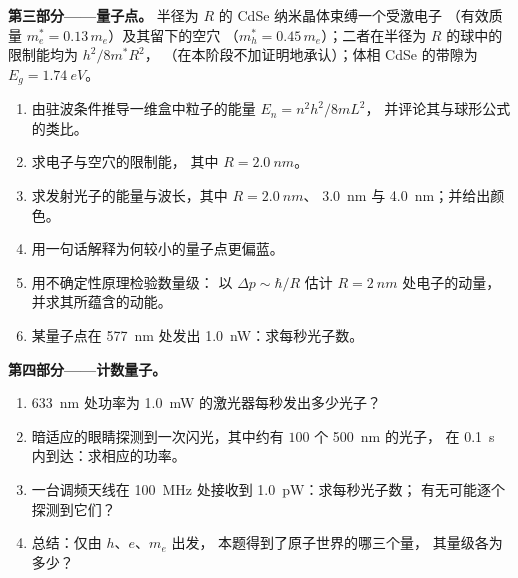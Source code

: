 \begin{problem}
\medskip
\noindent\textbf{第三部分——量子点。}
半径为 $R$ 的 CdSe 纳米晶体束缚一个受激电子
（有效质量 $m_e^\ast = 0.13\,m_e$）及其留下的空穴
（$m_h^\ast = 0.45\,m_e$）；二者在半径为 $R$ 的球中的限制能均为 $h^2/8m^\ast R^2$，
（在本阶段不加证明地承认）；体相 CdSe 的带隙为
$E_g = \qty{1.74}{eV}$。
\begin{enumerate}[resume]
  \item 由驻波条件推导一维盒中粒子的能量
        $E_n = n^2h^2/8mL^2$，
        并评论其与球形公式的类比。
  \item 求电子与空穴的限制能，
        其中 $R = \qty{2.0}{nm}$。
  \item 求发射光子的能量与波长，其中 $R = \qty{2.0}{nm}$、
        \qty{3.0}{nm} 与 \qty{4.0}{nm}；并给出颜色。
  \item 用一句话解释为何较小的量子点更偏蓝。
  \item 用不确定性原理检验数量级：
        以 $\Delta p \sim \hbar/R$ 估计 $R = \qty{2}{nm}$ 处电子的动量，
        并求其所蕴含的动能。
  \item 某量子点在 \qty{577}{nm} 处发出 \qty{1.0}{nW}：求每秒光子数。
\end{enumerate}

\medskip
\noindent\textbf{第四部分——计数量子。}
\begin{enumerate}[resume]
  \item \qty{633}{nm} 处功率为 \qty{1.0}{mW} 的激光器每秒发出多少光子？
  \item 暗适应的眼睛探测到一次闪光，其中约有 $100$ 个 \qty{500}{nm} 的光子，
        在 \qty{0.1}{s} 内到达：求相应的功率。
  \item 一台调频天线在 \qty{100}{MHz} 处接收到 \qty{1.0}{pW}：求每秒光子数；
        有无可能逐个探测到它们？
  \item 总结：仅由 $h$、$e$、$m_e$ 出发，
        本题得到了原子世界的哪三个量，
        其量级各为多少？
\end{enumerate}
\end{problem}
